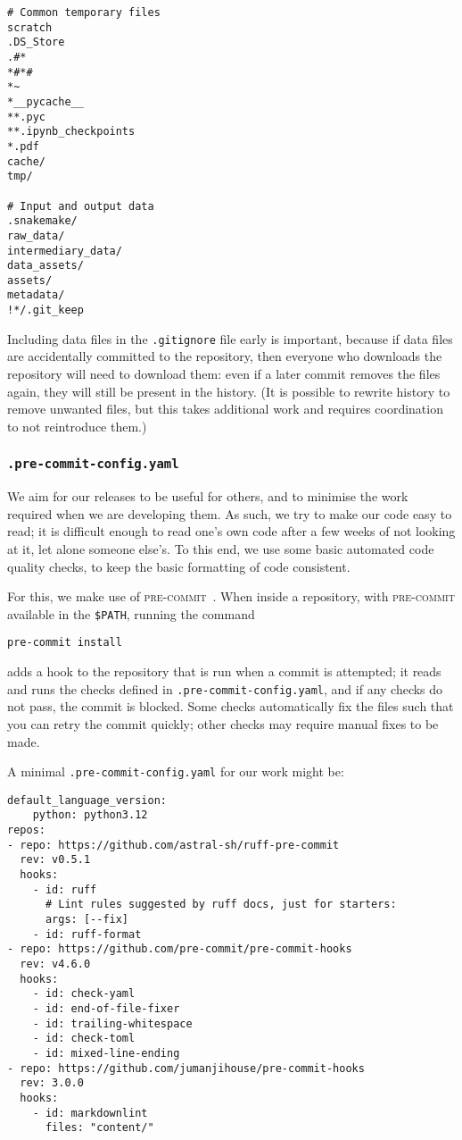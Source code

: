 \documentclass{article}
\newcommand\filename[1]{\texttt{#1}\xspace}
\newcommand\program[1]{\textsc{#1}\xspace}
\begin{document}
\begin{verbatim}
# Common temporary files
scratch
.DS_Store
.#*
*#*#
*~
*__pycache__
**.pyc
**.ipynb_checkpoints
*.pdf
cache/
tmp/

# Input and output data
.snakemake/
raw_data/
intermediary_data/
data_assets/
assets/
metadata/
!*/.git_keep
\end{verbatim}

Including data files in the \filename{.gitignore} file early is important,
because if data files are accidentally committed to the repository,
then everyone who downloads the repository will need to download them:
even if a later commit removes the files again,
they will still be present in the history.
(It is possible to rewrite history to remove unwanted files,
but this takes additional work and requires coordination to not reintroduce them.)

\subsubsection{\filename{.pre-commit-config.yaml}}

We aim for our releases to be useful for others,
and to minimise the work required when we are developing them.
As such,
we try to make our code easy to read;
it is difficult enough to read one's own code
after a few weeks of not looking at it,
let alone someone else's.
To this end,
we use some basic automated code quality checks,
to keep the basic formatting of code consistent.

For this,
we make use of \program{pre-commit}~\cite{pre-commit}.
When inside a repository,
with \program{pre-commit} available in the \texttt{\$PATH},
running the command
\begin{verbatim}
pre-commit install
\end{verbatim}
adds a hook to the repository that is run when a commit is attempted;
it reads and runs the checks defined in \filename{.pre-commit-config.yaml},
and if any checks do not pass,
the commit is blocked.
Some checks automatically fix the files such that you can retry the commit quickly;
other checks may require manual fixes to be made.

A minimal \filename{.pre-commit-config.yaml} for our work might be:

\begin{verbatim}
default_language_version:
    python: python3.12
repos:
- repo: https://github.com/astral-sh/ruff-pre-commit
  rev: v0.5.1
  hooks:
    - id: ruff
      # Lint rules suggested by ruff docs, just for starters:
      args: [--fix]
    - id: ruff-format
- repo: https://github.com/pre-commit/pre-commit-hooks
  rev: v4.6.0
  hooks:
    - id: check-yaml
    - id: end-of-file-fixer
    - id: trailing-whitespace
    - id: check-toml
    - id: mixed-line-ending
- repo: https://github.com/jumanjihouse/pre-commit-hooks
  rev: 3.0.0
  hooks:
    - id: markdownlint
      files: "content/"
\end{verbatim}
\end{document}
